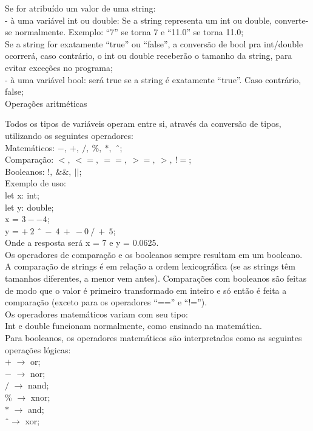 \documentclass[12pt,a4paper]{article}
\begin{document}
Se for atribuído um valor de uma string:\\[0.15cm]
- à uma variável int ou double: Se a string representa um int ou double, converte-se normalmente. Exemplo: ``7'' se torna 7 e ``11.0'' se torna 11.0;\\
Se a string for exatamente ``true'' ou ``false'', a conversão de bool pra int/double ocorrerá, caso contrário, o int ou double receberão o tamanho da string, para evitar exceções no programa;\\
- à uma variável bool: será true se a string é exatamente ``true''. Caso contrário, false;\\

\hypertarget{label3}{\Large{Operações aritméticas}}\\[0.3cm]
\normalsize

Todos os tipos de variáveis operam entre si, através da conversão de tipos, utilizando os seguintes operadores:\\[0.2cm]
Matemáticos: $-,\ +,\ /,\ \%,\ *,$ \^\ ;\\
Comparação: $<,\ <=,\ ==,\ >=,\ >,\ !=$;\\
Booleanos: $!,\ \&\&,\ ||$;\\[0.6cm]
Exemplo de uso:\\[0.3cm]
let x: int;\\
let y: double;\\

x = $3--4$;\\

y = $+\ 2$ \^\ $\ -\ 4\ +\ -0\ /\ +\ 5$;\\[0.5cm]
Onde a resposta será x = 7 e y = 0.0625.\\


Os operadores de comparação e os booleanos sempre resultam em um booleano. A comparação de strings é em relação a ordem lexicográfica (se as strings têm tamanhos diferentes, a menor vem antes). Comparações com booleanos são feitas de modo que o valor é primeiro transformado em inteiro e só então é feita a comparação (exceto para os operadores ``=='' e ``!='').\\

Os operadores matemáticos variam com seu tipo:\\
Int e double funcionam normalmente, como ensinado na matemática.\\

Para booleanos, os operadores matemáticos são interpretados como as seguintes operações lógicas:\\[0.2cm]
$+$ $\rightarrow$ or;\\
$-$ $\rightarrow$ nor;\\
$/$ $\rightarrow$ nand;\\
\% $\rightarrow$ xnor;\\
$*$ $\rightarrow$ and;\\
\^ \ $\rightarrow$ xor;\\
\end{document}
